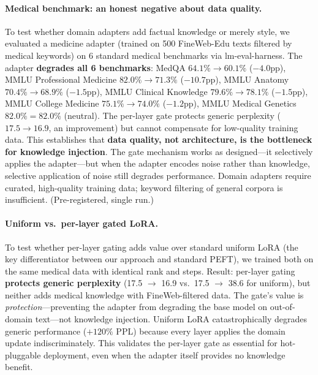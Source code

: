 \documentclass{article}
\begin{document}
\paragraph{Medical benchmark: an honest negative about data quality.}
\label{sec:medical-negative}
To test whether domain adapters add factual knowledge or merely style,
we evaluated a medicine adapter (trained on 500 FineWeb-Edu texts
filtered by medical keywords) on 6 standard medical benchmarks via
lm-eval-harness. The adapter \textbf{degrades all 6 benchmarks}:
MedQA $64.1\% \to 60.1\%$ ($-4.0$pp),
MMLU Professional Medicine $82.0\% \to 71.3\%$ ($-10.7$pp),
MMLU Anatomy $70.4\% \to 68.9\%$ ($-1.5$pp),
MMLU Clinical Knowledge $79.6\% \to 78.1\%$ ($-1.5$pp),
MMLU College Medicine $75.1\% \to 74.0\%$ ($-1.2$pp),
MMLU Medical Genetics $82.0\% = 82.0\%$ (neutral).
The per-layer gate protects generic perplexity ($17.5 \to 16.9$, an
improvement) but cannot compensate for low-quality training data. This
establishes that \textbf{data quality, not architecture, is the
bottleneck for knowledge injection}. The gate mechanism works as
designed---it selectively applies the adapter---but when the adapter
encodes noise rather than knowledge, selective application of noise
still degrades performance. Domain adapters require curated,
high-quality training data; keyword filtering of general corpora is
insufficient. (Pre-registered, single run.)

\paragraph{Uniform vs.\ per-layer gated LoRA.}
To test whether per-layer gating adds value over standard uniform LoRA
(the key differentiator between our approach and standard PEFT), we
trained both on the same medical data with identical rank and steps.
Result: per-layer gating \textbf{protects generic perplexity} (17.5
$\to$ 16.9 vs.\ 17.5 $\to$ 38.6 for uniform), but neither adds
medical knowledge with FineWeb-filtered data. The gate's value is
\emph{protection}---preventing the adapter from degrading the base
model on out-of-domain text---not knowledge injection. Uniform LoRA
catastrophically degrades generic performance ($+120\%$ PPL) because
every layer applies the domain update indiscriminately. This validates
the per-layer gate as essential for hot-pluggable deployment, even when
the adapter itself provides no knowledge benefit.
\end{document}
